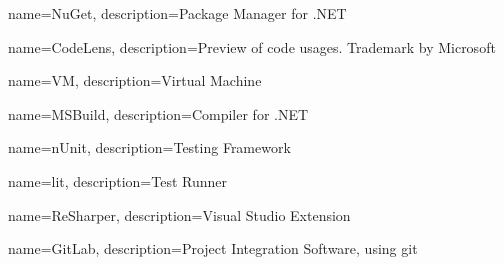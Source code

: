 {
	name=NuGet,
	description={Package Manager for .NET}
}

{
	name=CodeLens,
	description={Preview of code usages. Trademark by Microsoft}
}

{
	name=VM,
	description={Virtual Machine}
}

{
	name=MSBuild,
	description={Compiler for .NET}
}

{
	name=nUnit,
	description={Testing Framework}
}

{
	name=lit,
	description={Test Runner}
}

{
	name=ReSharper,
	description={Visual Studio Extension}
}

{
	name=GitLab,
	description={Project Integration Software, using git}
}
